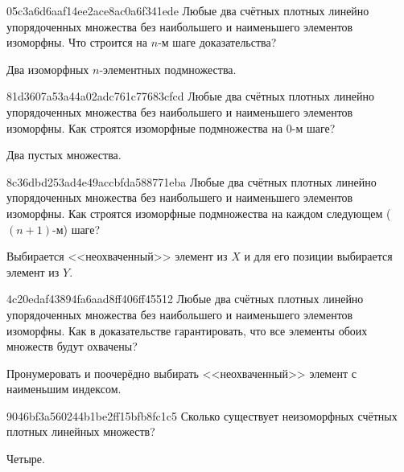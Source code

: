 \begin{note}{05c3a6d6aaf14ee2ace8ac0a6f341ede}
    Любые два счётных плотных линейно упорядоченных множества без наибольшего и наименьшего элементов изоморфны.
    Что строится на \({ n }\)-м шаге доказательства?

    \begin{cloze}{1}
        Два изоморфных \({ n }\)-элементных подмножества.
    \end{cloze}
\end{note}

\begin{note}{81d3607a53a44a02adc761c77683cfcd}
    Любые два счётных плотных линейно упорядоченных множества без наибольшего и наименьшего элементов изоморфны.
    Как строятся изоморфные подмножества на \({ 0 }\)-м шаге?

    \begin{cloze}{1}
        Два пустых множества.
    \end{cloze}
\end{note}

\begin{note}{8c36dbd253ad4e49accbfda588771eba}
    Любые два счётных плотных линейно упорядоченных множества без наибольшего и наименьшего элементов изоморфны.
    Как строятся изоморфные подмножества на каждом следующем (\({ (n+1) }\)-м) шаге?

    \begin{cloze}{1}
        Выбирается <<неохваченный>> элемент из \({ X }\) и для его позиции выбирается элемент из \({ Y }\).
    \end{cloze}
\end{note}

\begin{note}{4c20edaf43894fa6aad8ff406ff45512}
    Любые два счётных плотных линейно упорядоченных множества без наибольшего и наименьшего элементов изоморфны.
    Как в доказательстве гарантировать, что все элементы обоих множеств будут охвачены?

    \begin{cloze}{1}
        Пронумеровать и поочерёдно выбирать <<неохваченный>> элемент с наименьшим индексом.
    \end{cloze}
\end{note}

\begin{note}{9046bf3a560244b1be2ff15bfb8fc1c5}
    Сколько существует неизоморфных счётных плотных линейных множеств?

    \begin{cloze}{1}
        Четыре.
    \end{cloze}
\end{note}

